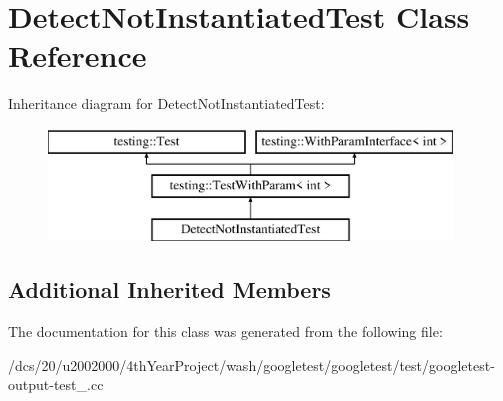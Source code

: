 \hypertarget{classDetectNotInstantiatedTest}{}\section{Detect\+Not\+Instantiated\+Test Class Reference}
\label{classDetectNotInstantiatedTest}
Inheritance diagram for Detect\+Not\+Instantiated\+Test\+:\begin{figure}[H]
\begin{center}
\leavevmode
\includegraphics[height=3.000000cm]{classDetectNotInstantiatedTest}
\end{center}
\end{figure}
\subsection*{Additional Inherited Members}


The documentation for this class was generated from the following file\+:\begin{DoxyCompactItemize}
\item 
/dcs/20/u2002000/4th\+Year\+Project/wash/googletest/googletest/test/googletest-\/output-\/test\+\_\+.\+cc\end{DoxyCompactItemize}
